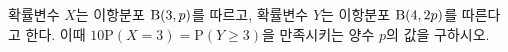 확률변수 $X$는 이항분포 $\mathrm{B}(3{,}\mkern3mu\mathopen{}p)$를 따르고, 확률변수 $Y$는 이항분포 $\mathrm{B}(4{,}\mkern3mu\mathopen{}2p)$를 따른다고 한다. 이때 $10\mathrm{P}(X=3)=\mathrm{P}(Y\ge 3)$을 만족시키는 양수 $p$의 값을 구하시오.
